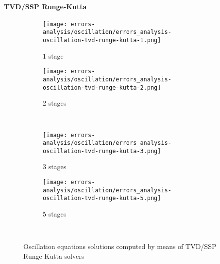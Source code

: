 \documentclass[pdftex,preprint,3p,times,numbers]{elsarticle}
\begin{document}
\paragraph{TVD/SSP Runge-Kutta}

\begin{figure}[!ht]
  \centering
  \begin{subfigure}[b]{0.45\textwidth}
    \centering
    \texttt{[image: errors-analysis/oscillation/errors\_analysis-oscillation-tvd-runge-kutta-1.png]}
    \caption{1 stage}\label{fig:results-oscillation-tvd-runge-kutta-1}
  \end{subfigure}\quad%
  \begin{subfigure}[b]{0.45\textwidth}
    \centering
    \texttt{[image: errors-analysis/oscillation/errors\_analysis-oscillation-tvd-runge-kutta-2.png]}
    \caption{2 stages}\label{fig:results-oscillation-tvd-runge-kutta-2}
  \end{subfigure}\\
  \begin{subfigure}[b]{0.45\textwidth}
    \centering
    \texttt{[image: errors-analysis/oscillation/errors\_analysis-oscillation-tvd-runge-kutta-3.png]}
    \caption{3 stages}\label{fig:results-oscillation-tvd-runge-kutta-3}
  \end{subfigure}\quad%
  \begin{subfigure}[b]{0.45\textwidth}
    \centering
    \texttt{[image: errors-analysis/oscillation/errors\_analysis-oscillation-tvd-runge-kutta-5.png]}
    \caption{5 stages}\label{fig:results-oscillation-tvd-runge-kutta-5}
  \end{subfigure}\\
  \caption{Oscillation equations solutions computed by means of TVD/SSP Runge-Kutta solvers}\label{fig:results-oscillation-tvd-runge-kutta}
\end{figure}
\end{document}
